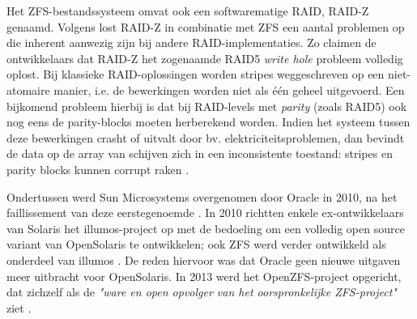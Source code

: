 Het ZFS-bestandssysteem omvat ook een softwarematige RAID, RAID-Z genaamd. Volgens \textcite{Bonwick2005} lost RAID-Z in combinatie met ZFS een aantal problemen op die inherent aanwezig zijn bij andere RAID-implementaties. Zo claimen de ontwikkelaars dat RAID-Z het zogenaamde RAID5 \textit{write hole} probleem volledig oplost. Bij klassieke RAID-oplossingen worden stripes weggeschreven op een niet-atomaire manier, i.e. de bewerkingen worden niet als één geheel uitgevoerd. Een bijkomend probleem hierbij is dat bij RAID-levels met \textit{parity} (zoals RAID5) ook nog eens de parity-blocks moeten herberekend worden. Indien het systeem tussen deze bewerkingen crasht of uitvalt door bv. elektriciteitsproblemen, dan bevindt de data op de array van schijven zich in een inconsistente toestand: stripes en parity blocks kunnen corrupt raken \autocite{Bonwick2005}. 


Ondertussen werd Sun Microsystems overgenomen door Oracle in 2010, na het faillissement van deze eerstegenoemde \autocite{OracleOnbekend}. In 2010 richtten enkele ex-ontwikkelaars van Solaris het illumos-project op met de bedoeling om een volledig open source variant van OpenSolaris te ontwikkelen; ook ZFS werd verder ontwikkeld als onderdeel van illumos \autocite{illumos2012}. De reden hiervoor was dat Oracle geen nieuwe uitgaven meer uitbracht voor OpenSolaris. In 2013 werd het OpenZFS-project opgericht, dat zichzelf als de \textit{"ware en open opvolger van het oorspronkelijke ZFS-project"} ziet \autocite{OpenZFSHistory2014}.

